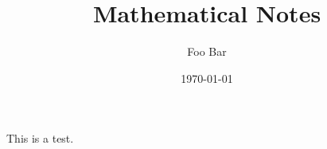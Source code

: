 \documentclass[working]{article}
\title{Mathematical Notes}
\author{Foo Bar}
\date{\today}
\begin{document}
\maketitle


This is a test.



\listnotes


\end{document}
